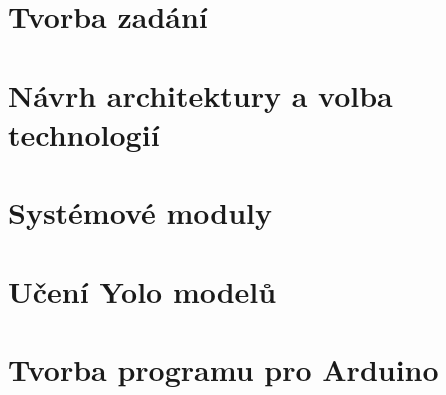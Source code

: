 \newpage
\chapter{Tvorba zadání}\label{ch:tvorba-zadani}
\newcommand{\textcolorname}{black}
\textcolor{\textcolorname}{}

\newpage
\chapter{Návrh architektury a volba technologií}\label{ch:navrh-architektury-a-volba-technologii}
\textcolor{\textcolorname}{}

\newpage
\chapter{Systémové moduly}\label{ch:popis-jednotlivych-modulu}
\textcolor{\textcolorname}{}
\textcolor{\textcolorname}{}
\textcolor{\textcolorname}{}
\textcolor{\textcolorname}{}
\textcolor{\textcolorname}{}
\textcolor{\textcolorname}{}
\textcolor{\textcolorname}{}
\textcolor{\textcolorname}{}
\textcolor{\textcolorname}{}
\textcolor{\textcolorname}{}
\textcolor{\textcolorname}{}
\textcolor{\textcolorname}{}
\textcolor{\textcolorname}{}

\newpage
\chapter{Učení Yolo modelů}\label{ch:uceni_yolo_modelu}
\textcolor{\textcolorname}{}
\newpage
\textcolor{\textcolorname}{}

\newpage
\chapter{Tvorba programu pro Arduino}\label{ch:tvorba-programu-pro-arduino}
\textcolor{\textcolorname}{}

